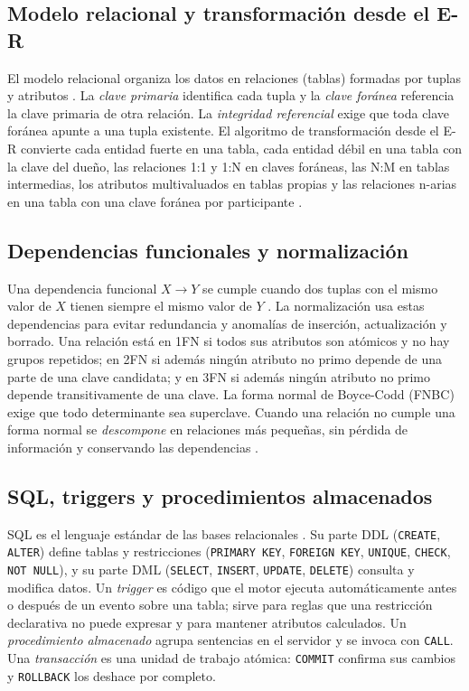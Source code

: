 \documentclass[11pt,a4paper]{article}
\begin{document}
\subsection{Modelo relacional y transformación desde el E-R}
El modelo relacional organiza los datos en relaciones (tablas) formadas por tuplas y atributos \cite{silberschatz}. La \emph{clave primaria} identifica cada tupla y la \emph{clave foránea} referencia la clave primaria de otra relación. La \emph{integridad referencial} exige que toda clave foránea apunte a una tupla existente. El algoritmo de transformación desde el E-R convierte cada entidad fuerte en una tabla, cada entidad débil en una tabla con la clave del dueño, las relaciones 1:1 y 1:N en claves foráneas, las N:M en tablas intermedias, los atributos multivaluados en tablas propias y las relaciones n-arias en una tabla con una clave foránea por participante \cite{elmasri}.

\subsection{Dependencias funcionales y normalización}
Una dependencia funcional $X \rightarrow Y$ se cumple cuando dos tuplas con el mismo valor de $X$ tienen siempre el mismo valor de $Y$ \cite{elmasri}. La normalización usa estas dependencias para evitar redundancia y anomalías de inserción, actualización y borrado. Una relación está en 1FN si todos sus atributos son atómicos y no hay grupos repetidos; en 2FN si además ningún atributo no primo depende de una parte de una clave candidata; y en 3FN si además ningún atributo no primo depende transitivamente de una clave. La forma normal de Boyce-Codd (FNBC) exige que todo determinante sea superclave. Cuando una relación no cumple una forma normal se \emph{descompone} en relaciones más pequeñas, sin pérdida de información y conservando las dependencias \cite{silberschatz}.

\subsection{SQL, triggers y procedimientos almacenados}
SQL es el lenguaje estándar de las bases relacionales \cite{silberschatz}. Su parte DDL (\texttt{CREATE}, \texttt{ALTER}) define tablas y restricciones (\texttt{PRIMARY KEY}, \texttt{FOREIGN KEY}, \texttt{UNIQUE}, \texttt{CHECK}, \texttt{NOT NULL}), y su parte DML (\texttt{SELECT}, \texttt{INSERT}, \texttt{UPDATE}, \texttt{DELETE}) consulta y modifica datos. Un \emph{trigger} es código que el motor ejecuta automáticamente antes o después de un evento sobre una tabla; sirve para reglas que una restricción declarativa no puede expresar y para mantener atributos calculados. Un \emph{procedimiento almacenado} agrupa sentencias en el servidor y se invoca con \texttt{CALL}. Una \emph{transacción} es una unidad de trabajo atómica: \texttt{COMMIT} confirma sus cambios y \texttt{ROLLBACK} los deshace por completo.
\end{document}
